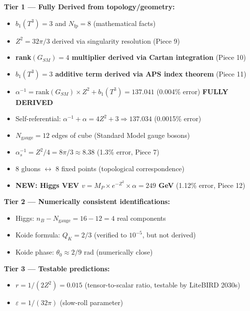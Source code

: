 \documentclass[12pt,a4paper]{article}
\newcommand{\Zsq}{Z^2}
\begin{document}
\begin{tcolorbox}[colback=red!5!white, colframe=red!60!black, title=Epistemic Classification of All Claims (v8.6.0)]
\textbf{Tier 1 --- Fully Derived from topology/geometry:}
\begin{itemize}[itemsep=0pt]
    \item $b_1(T^3) = 3$ and $N_{\text{fp}} = 8$ (mathematical facts)
    \item $\Zsq = 32\pi/3$ derived via singularity resolution (Piece 9)
    \item \textbf{rank$(G_{SM}) = 4$ multiplier derived via Cartan integration} (Piece 10)
    \item \textbf{$b_1(T^3) = 3$ additive term derived via APS index theorem} (Piece 11)
    \item $\alpha^{-1} = \text{rank}(G_{SM}) \times \Zsq + b_1(T^3) = 137.041$ (0.004\% error) \textbf{FULLY DERIVED}
    \item Self-referential: $\alpha^{-1} + \alpha = 4\Zsq + 3 \Rightarrow 137.034$ (0.0015\% error)
    \item $N_{\text{gauge}} = 12$ edges of cube (Standard Model gauge bosons)
    \item $\alpha_s^{-1} = \Zsq/4 = 8\pi/3 \approx 8.38$ (1.3\% error, Piece 7)
    \item 8 gluons $\leftrightarrow$ 8 fixed points (topological correspondence)
    \item \textbf{NEW: Higgs VEV $v = M_P \times e^{-\Zsq} \times \alpha = 249$ GeV} (1.12\% error, Piece 12)
\end{itemize}

\textbf{Tier 2 --- Numerically consistent identifications:}
\begin{itemize}[itemsep=0pt]
    \item Higgs: $n_B - N_{\text{gauge}} = 16 - 12 = 4$ real components
    \item Koide formula: $Q_K = 2/3$ (verified to $10^{-5}$, but not derived)
    \item Koide phase: $\theta_0 \approx 2/9$ rad (numerically close)
\end{itemize}

\textbf{Tier 3 --- Testable predictions:}
\begin{itemize}[itemsep=0pt]
    \item $r = 1/(2\Zsq) = 0.015$ (tensor-to-scalar ratio, testable by LiteBIRD 2030s)
    \item $\varepsilon = 1/(32\pi)$ (slow-roll parameter)
\end{itemize}


\end{tcolorbox}
\end{document}
